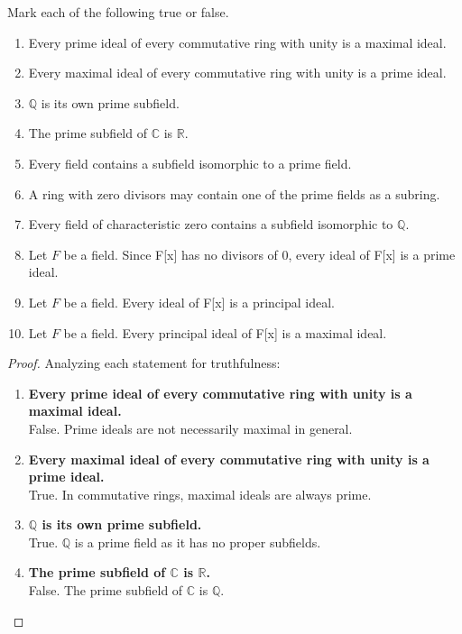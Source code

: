 \documentclass[12pt]{amsart}
\theoremstyle{definition}
\numberwithin{equation}{section}
\theoremstyle{plain}
\renewcommand{\C}{\mathbb{C}}
\newcommand{\R}{\mathbb{R}}
\newcommand{\Q}{\mathbb{Q}}
\begin{document}
\begin{exercise}{14} Mark each of the following true or false.
    \begin{enumerate}[label=\alph*.]
\item Every prime ideal of every commutative ring with unity is a maximal ideal.
\item Every maximal ideal of every commutative ring with unity is a prime ideal.
\item $\Q$ is its own prime subfield.
\item The prime subfield of $\C$ is $\R$.
\item Every field contains a subfield isomorphic to a prime field.
\item A ring with zero divisors may contain one of the prime fields as a subring.
\item Every field of characteristic zero contains a subfield isomorphic to $\Q$.
\item Let $F$ be a field. Since F[x] has no divisors of 0, every ideal of F[x] is a prime ideal.
\item Let $F$ be a field. Every ideal of F[x] is a principal ideal.
\item Let $F$ be a field. Every principal ideal of F[x] is a maximal ideal.
    \end{enumerate}
    
\begin{proof} Analyzing each statement for truthfulness:

\begin{enumerate}[label=\alph*.]
    \item \textbf{Every prime ideal of every commutative ring with unity is a maximal ideal.} \\
    False. Prime ideals are not necessarily maximal in general.

    \item \textbf{Every maximal ideal of every commutative ring with unity is a prime ideal.} \\
    True. In commutative rings, maximal ideals are always prime.

    \item \textbf{\(\mathbb{Q}\) is its own prime subfield.} \\
    True. \(\mathbb{Q}\) is a prime field as it has no proper subfields.

    \item \textbf{The prime subfield of \(\mathbb{C}\) is \(\mathbb{R}\).} \\
    False. The prime subfield of \(\mathbb{C}\) is \(\mathbb{Q}\).


\end{enumerate}
\end{proof}
\end{exercise}
\end{document}
